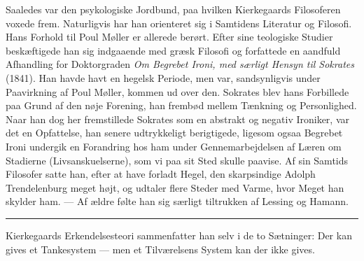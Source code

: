 \documentclass[12pt,a4paper,openany]{book}
\newcommand{\opage}[1]{\marginnote{\footnotesize\textit{[#1]}}}
\begin{document}
Saaledes var den psykologiske Jordbund, paa hvilken Kierkegaards Filosoferen
voxede frem. Naturligvis har han orienteret sig i Samtidens Literatur og
Filosofi. Hans Forhold til Poul Møller er allerede berørt. Efter sine
teologiske Studier
\setcounter{footnote}{0}%
\opage{151}beskæftigede han sig indgaaende med græsk Filosofi og forfattede en
aandfuld Afhandling for Doktorgraden \textit{Om Begrebet Ironi, med særligt
Hensyn til Sokrates} (1841). Han havde havt en hegelsk Periode, men var,
sandsynligvis under Paavirkning af Poul Møller, kommen ud over den. Sokrates
blev hans Forbillede paa Grund af den nøje Forening, han frembød mellem
Tænkning og Personlighed. Naar han dog her fremstillede Sokrates som en
abstrakt og negativ Ironiker, var det en Opfattelse, han senere udtrykkeligt
berigtigede, ligesom ogsaa Begrebet Ironi undergik en Forandring hos ham under
Gennemarbejdelsen af Læren om Stadierne (Livsanskuelserne), som vi paa sit Sted
skulle paavise. Af sin Samtids Filosofer satte han, efter at have forladt
Hegel, den skarpsindige Adolph Trendelenburg meget højt, og udtaler flere
Steder med Varme, hvor Meget han skylder ham. --- Af ældre følte han sig
særligt tiltrukken af Lessing og Hamann.

\begin{center}\rule{2cm}{0.4pt}\end{center}

Kierkegaards Erkendelsesteori sammenfatter han selv i de to Sætninger: Der kan
gives et Tankesystem --- men et Tilværelsens System kan der ikke gives.
\end{document}
